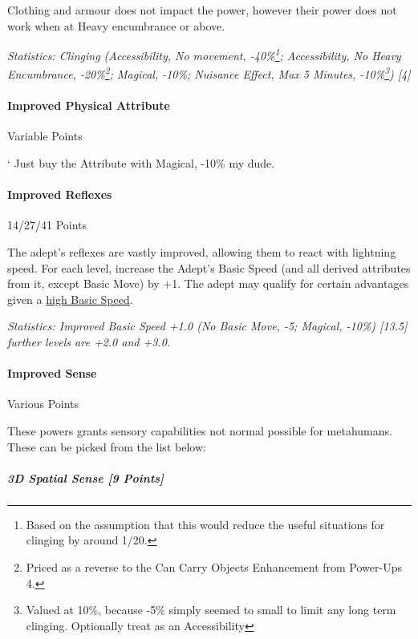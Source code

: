 \begin{multicols}{3}
	Clothing and armour does not impact the power, however their power does not work when at Heavy encumbrance or above.

	\textcolor{OliveGreen}{\textit{Statistics: Clinging (Accessibility, No movement, -40\%\footnote{Based on the assumption that this would reduce the useful situations for clinging by around 1/20.}; Accessibility, No Heavy Encumbrance, -20\%\footnote{Priced as a reverse to the Can Carry Objects Enhancement from Power-Ups 4.}; Magical, -10\%; Nuisance Effect, Max 5 Minutes, -10\%\footnote{Valued at 10\%, because -5\% simply seemed to small to limit any long term clinging. Optionally treat as an Accessibility}) [4] }}

	\paragraph{Improved Physical Attribute}
	\begin{flushright}
		Variable Points
	\end{flushright}
	`
	Just buy the Attribute with Magical, -10\% my dude.
	
	\paragraph{Improved Reflexes}
	\begin{flushright}
		14/27/41 Points
	\end{flushright}

	The adept's reflexes are vastly improved, allowing them to react with lightning speed. For each level, increase the Adept's Basic Speed (and all derived attributes from it, except Basic Move) by +1. The adept may qualify for certain advantages given a \hyperref[high_basic_speed]{high Basic Speed}.

	\textcolor{OliveGreen}{\textit{Statistics: Improved Basic Speed +1.0 (No Basic Move, -5; Magical, -10\%) [13.5] further levels are +2.0 and +3.0. }}

	\paragraph{Improved Sense}
	\begin{flushright}
		Various Points
	\end{flushright}

	These powers grants sensory capabilities not normal possible for metahumans. These can be picked from the list below:
	
	\subparagraph{3D Spatial Sense [9 Points]}
	

\end{multicols}
